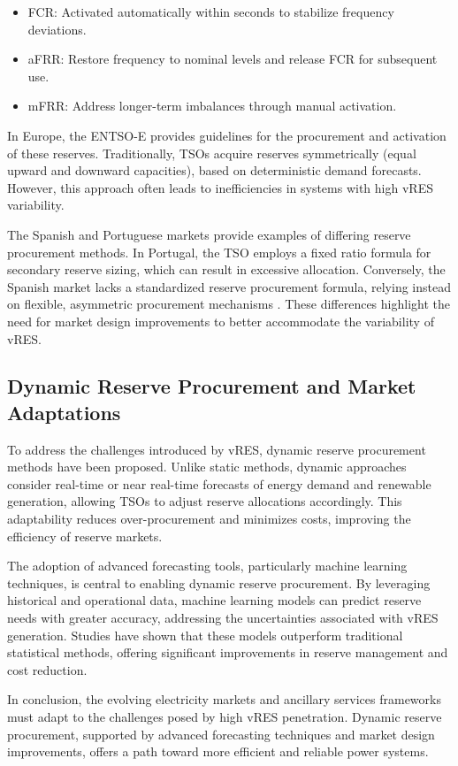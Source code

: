 \begin{itemize}
    \item	\gls{FCR}: Activated automatically within seconds to stabilize frequency deviations.
    \item	\gls{aFRR}: Restore frequency to nominal levels and release FCR for subsequent use.
    \item	\gls{mFRR}: Address longer-term imbalances through manual activation.
\end{itemize}

In Europe, the \gls{ENTSO-E} provides guidelines for the procurement and activation of these reserves. Traditionally, \gls{TSO}s acquire reserves symmetrically (equal upward and downward capacities), based on deterministic demand forecasts. However, this approach often leads to inefficiencies in systems with high \gls{vRES} variability. \par

The Spanish and Portuguese markets provide examples of differing reserve procurement methods. In Portugal, the \gls{TSO} employs a fixed ratio formula for secondary reserve sizing, which can result in excessive allocation. Conversely, the Spanish market lacks a standardized reserve procurement formula, relying instead on flexible, asymmetric procurement mechanisms \cite{Frade2019_market}. These differences highlight the need for market design improvements to better accommodate the variability of \gls{vRES}.

\subsection{Dynamic Reserve Procurement and Market Adaptations}

To address the challenges introduced by \gls{vRES}, dynamic reserve procurement methods have been proposed. Unlike static methods, dynamic approaches consider real-time or near real-time forecasts of energy demand and renewable generation, allowing \gls{TSO}s to adjust reserve allocations accordingly. This adaptability reduces over-procurement and minimizes costs, improving the efficiency of reserve markets.

The adoption of advanced forecasting tools, particularly machine learning techniques, is central to enabling dynamic reserve procurement. By leveraging historical and operational data, machine learning models can predict reserve needs with greater accuracy, addressing the uncertainties associated with \gls{vRES} generation. Studies have shown that these models outperform traditional statistical methods, offering significant improvements in reserve management and cost reduction.

In conclusion, the evolving electricity markets and ancillary services frameworks must adapt to the challenges posed by high \gls{vRES} penetration. Dynamic reserve procurement, supported by advanced forecasting techniques and market design improvements, offers a path toward more efficient and reliable power systems.

